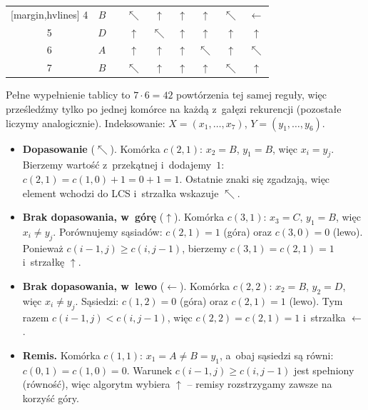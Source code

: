 \begin{aztable}
\begin{minipage}{0.48\linewidth}
\begin{NiceTabular}{cc|c|cccccc}[margin,hvlines]
			4   & $B$   &       & $\nwarrow$ & $\uparrow$   & $\uparrow$   & $\uparrow$   & $\nwarrow$   & $\leftarrow$ \\
			5   & $D$   &       & $\uparrow$ & $\nwarrow$   & $\uparrow$   & $\uparrow$   & $\uparrow$   & $\uparrow$   \\
			6   & $A$   &       & $\uparrow$ & $\uparrow$   & $\uparrow$   & $\nwarrow$   & $\uparrow$   & $\nwarrow$   \\
			7   & $B$   &       & $\nwarrow$ & $\uparrow$   & $\uparrow$   & $\uparrow$   & $\nwarrow$   & $\uparrow$   \\
		\end{NiceTabular}
	\end{minipage}
\end{aztable}

\begin{dygresja}
	Pełne wypełnienie tablicy to $7 \cdot 6 = 42$ powtórzenia tej samej reguły, więc
	prześledźmy tylko po jednej komórce na każdą z~gałęzi rekurencji (pozostałe
	liczymy analogicznie). Indeksowanie: $X = (x_1, \dots, x_7)$, $Y = (y_1, \dots, y_6)$.

	\begin{itemize}
		\item \textbf{Dopasowanie} ($\nwarrow$). Komórka $c(2, 1)$: $x_2 = B$, $y_1 = B$,
		      więc $x_i = y_j$. Bierzemy wartość z~przekątnej i~dodajemy~$1$:
		      $c(2, 1) = c(1, 0) + 1 = 0 + 1 = 1$. Ostatnie znaki się zgadzają,
		      więc element wchodzi do LCS i~strzałka wskazuje $\nwarrow$.

		\item \textbf{Brak dopasowania, w~górę} ($\uparrow$). Komórka $c(3, 1)$: $x_3 = C$,
		      $y_1 = B$, więc $x_i \neq y_j$. Porównujemy sąsiadów:
		      $c(2, 1) = 1$ (góra) oraz $c(3, 0) = 0$ (lewo). Ponieważ
		      $c(i - 1, j) \geq c(i, j - 1)$, bierzemy $c(3, 1) = c(2, 1) = 1$ i~strzałkę $\uparrow$.

		\item \textbf{Brak dopasowania, w~lewo} ($\leftarrow$). Komórka $c(2, 2)$: $x_2 = B$,
		      $y_2 = D$, więc $x_i \neq y_j$. Sąsiedzi: $c(1, 2) = 0$ (góra) oraz
		      $c(2, 1) = 1$ (lewo). Tym razem $c(i - 1, j) < c(i, j - 1)$, więc
		      $c(2, 2) = c(2, 1) = 1$ i~strzałka $\leftarrow$.

		\item \textbf{Remis.} Komórka $c(1, 1)$: $x_1 = A \neq B = y_1$, a~obaj sąsiedzi
		      są równi: $c(0, 1) = c(1, 0) = 0$. Warunek $c(i - 1, j) \geq c(i, j - 1)$
		      jest spełniony (równość), więc algorytm wybiera $\uparrow$ -- remisy
		      rozstrzygamy zawsze na korzyść góry.
	\end{itemize}
\end{dygresja}

